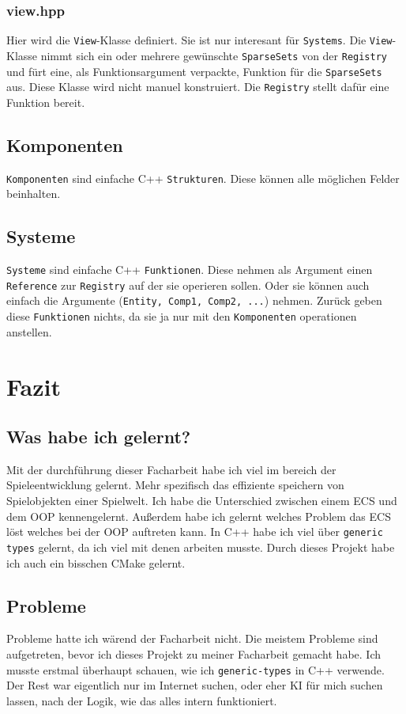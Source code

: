 \documentclass[12pt, a4paper, oneside, ngerman]{scrartcl}
\begin{document}
\subsubsection{view.hpp}
Hier wird die \texttt{View}-Klasse definiert.
Sie ist nur interesant für \texttt{Systems}.
Die \texttt{View}-Klasse nimmt sich ein oder mehrere gewünschte \texttt{SparseSets} von der \texttt{Registry} und fürt eine, als Funktionsargument verpackte, Funktion für die \texttt{SparseSets} aus.
Diese Klasse wird nicht manuel konstruiert.
Die \texttt{Registry} stellt dafür eine Funktion bereit.

\subsection{Komponenten}
\texttt{Komponenten} sind einfache C++ \texttt{Strukturen}.
Diese können alle möglichen Felder beinhalten.

\subsection{Systeme}
\texttt{Systeme} sind einfache C++ \texttt{Funktionen}.
Diese nehmen als Argument einen \texttt{Reference} zur \texttt{Registry} auf der sie operieren sollen.
Oder sie können auch einfach die Argumente (\texttt{Entity, Comp1, Comp2, ...}) nehmen.
Zurück geben diese \texttt{Funktionen} nichts, da sie ja nur mit den \texttt{Komponenten} operationen anstellen.

\section{Fazit}
\subsection{Was habe ich gelernt?}
Mit der durchführung dieser Facharbeit habe ich viel im bereich der Spieleentwicklung gelernt.
Mehr spezifisch das effiziente speichern von Spielobjekten einer Spielwelt.
Ich habe die Unterschied zwischen einem ECS und dem OOP kennengelernt.
Außerdem habe ich gelernt welches Problem das ECS löst welches bei der OOP auftreten kann.
In C++ habe ich viel über \texttt{generic types} gelernt, da ich viel mit denen arbeiten musste.
Durch dieses Projekt habe ich auch ein bisschen CMake gelernt.

\subsection{Probleme}
Probleme hatte ich wärend der Facharbeit nicht.
Die meistem Probleme sind aufgetreten, bevor ich dieses Projekt zu meiner Facharbeit gemacht habe.
Ich musste erstmal überhaupt schauen, wie ich \texttt{generic-types} in C++ verwende.
Der Rest war eigentlich nur im Internet suchen, oder eher KI für mich suchen lassen, nach der Logik, wie das alles intern funktioniert.
\end{document}
